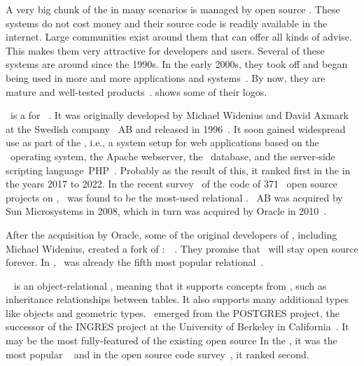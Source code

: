 %
A very big chunk of the  in many scenarios is managed by open source .
These systems do not cost money and their source code is readily available in the internet.
Large communities exist around them that can offer all kinds of advise.
This makes them very attractive for developers and users.
Several of these systems are around since the 1990s.
In the early 2000s, they took off and began being used in more and more applications and systems~\cite{P2004OSDMITM}.
By now, they are mature and well-tested products~\cite{C20245YOQ}.
 shows some of their logos.

\mysql\ is a  for ~\cite{WAM2002MRMDFTS,TA2024DDAMWPAM,BT2021HPM,RGS2021BTOTONAMDFPC,D2015LMAM}.
It was originally developed by Michael Widenius and David Axmark at the Swedish company \mysql~AB and released in 1996~\cite{C20245YOQ}.
It soon gained widespread use as part of the \lampStack, i.e., a system setup for web applications based on the \linux\ operating system, the Apache webserver, the \mysql\ database, and the server-side scripting language~PHP~\cite{C2022HAFTLS,H2020ULU2E}.
Probably as the result of this, it ranked first in the  in the years 2017 to 2022.
In the recent survey~\cite{PMPVEPWGSMB2025ATAODMSTTHOOSP} of the code of 371~ open source projects on \github, \mysql\ was found to be the most-used relational .
\mysql~AB was acquired by Sun Microsystems in 2008, which in turn was acquired by Oracle in 2010~\cite{C20245YOQ}.

After the acquisition by Oracle, some of the original developers of \mysql, including Michael Widenius, created a fork of \mysql:~\mariadb~\cite{R2014MM,B2019LTMEELFFSAA,D2015LMAM,AA2018QAWMV1ITSQ,AA2018QAWMV2IDQ}.
They promise that \mariadb\ will stay open source forever.
In \cite{PMPVEPWGSMB2025ATAODMSTTHOOSP}, \mariadb\ was already the fifth most popular relational~.

\postgresql~\cite{TA2024DDAMWPAM,FP2023LP,OH2017PUAR,B2024PELUYDW} is an object-relational , meaning that it supports concepts from , such as inheritance relationships between tables.
It also supports many additional types like  objects and geometric types.
\postgresql\ emerged from the POSTGRES project, the successor of the INGRES project at the University of Berkeley in California~\cite{C20245YOQ}.
It may be the most fully-featured of the existing open source  
In the , it was the most popular ~\cite{SE:SO:2024DS} and in the open source code survey~\cite{PMPVEPWGSMB2025ATAODMSTTHOOSP}, it ranked second.

